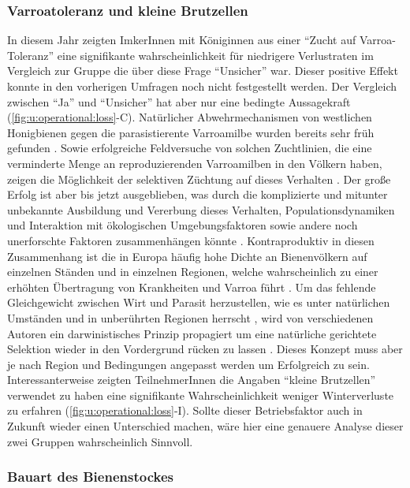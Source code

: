 \subsubsection{Varroatoleranz und kleine Brutzellen}

In diesem Jahr zeigten ImkerInnen mit Königinnen aus einer \enquote{Zucht auf Varroa-Toleranz} eine signifikante wahrscheinlichkeit für niedrigere Verlustraten im Vergleich zur Gruppe die über diese Frage \enquote{Unsicher} war. Dieser positive Effekt konnte in den vorherigen Umfragen noch nicht festgestellt werden. Der Vergleich zwischen \enquote{Ja} und \enquote{Unsicher} hat aber nur eine bedingte Aussagekraft (\cref{fig:u:operational:loss}-C).
\newline
Natürlicher Abwehrmechanismen von westlichen Honigbienen gegen die parasistierente Varroamilbe wurden bereits sehr früh gefunden \citep{ruttner1984}. Sowie erfolgreiche Feldversuche von solchen Zuchtlinien, die eine verminderte Menge an reproduzierenden Varroamilben in den Völkern haben, zeigen die Möglichkeit der selektiven Züchtung auf dieses Verhalten \citep{spivak2007}. Der große Erfolg ist aber bis jetzt ausgeblieben, was durch die komplizierte und mitunter unbekannte Ausbildung und Vererbung dieses Verhalten, Populationsdynamiken und Interaktion mit ökologischen Umgebungsfaktoren sowie andere noch unerforschte Faktoren zusammenhängen könnte \citep{fanny2020}. Kontraproduktiv in diesen Zusammenhang ist die in Europa häufig hohe Dichte an Bienenvölkern auf einzelnen Ständen und in einzelnen Regionen, welche wahrscheinlich zu einer erhöhten Übertragung von Krankheiten und Varroa führt \citep{seeley2015, forfert2016, dynes2019}. Um das fehlende Gleichgewicht zwischen Wirt und Parasit herzustellen, wie es unter natürlichen Umständen und in unberührten Regionen herrscht \citep{seeley2007}, wird von verschiedenen Autoren ein darwinistisches Prinzip propagiert um eine natürliche gerichtete Selektion wieder in den Vordergrund rücken zu lassen \citep{locke2016, neumann2017}. Dieses Konzept muss aber je nach Region und Bedingungen angepasst werden um Erfolgreich zu sein.
\newline
Interessanterweise zeigten TeilnehmerInnen die Angaben \enquote{kleine Brutzellen} verwendet zu haben eine signifikante Wahrscheinlichkeit weniger Winterverluste zu erfahren (\cref{fig:u:operational:loss}-I). Sollte dieser Betriebsfaktor auch in Zukunft wieder einen Unterschied machen, wäre hier eine genauere Analyse dieser zwei Gruppen wahrscheinlich Sinnvoll.

\subsubsection{Bauart des Bienenstockes}

